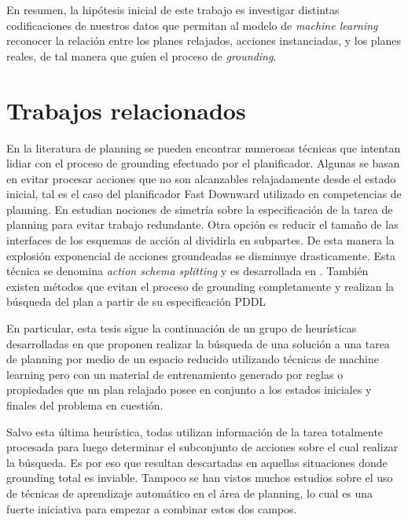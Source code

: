 En resumen, la hipótesis inicial de este trabajo es investigar distintas
codificaciones de nuestros datos que permitan al modelo de \emph{machine
learning} reconocer la relación entre los planes relajados, acciones
instanciadas, y los planes reales, de tal manera que guíen el proceso de
\emph{grounding}.

\section{Trabajos relacionados}

En la literatura de planning se pueden encontrar numerosas técnicas que intentan
lidiar con el proceso de grounding efectuado por el planificador. Algunas se
basan en evitar procesar acciones que no son alcanzables relajadamente desde el
estado inicial, tal es el caso del planificador Fast Downward
\citep{Helmert-2011} utilizado en competencias de planning. En
\citep{Röger_Sievers_Katz_2018} estudian nociones de simetría sobre la
especificación de la tarea de planning para evitar trabajo redundante. Otra
opción es reducir el tamaño de las interfaces de los esquemas de acción al
dividirla en subpartes. De esta manera la explosión exponencial de acciones
groundeadas se disminuye drasticamente. Esta técnica se denomina \emph{action
schema splitting} y es desarrollada en
\citep{Areces_Bustos_Dominguez_Hoffmann_2014}. También existen métodos que
evitan el proceso de grounding completamente y realizan la búsqueda del plan a
partir de su especificación PDDL \citep{Penberthy-1992}

En particular, esta tesis sigue la continuación de un grupo de heurísticas
desarrolladas en \citep{Gnad_Torralba_Dominguez_Areces_Bustos_2019} que proponen
realizar la búsqueda de una solución a una tarea de planning por medio de un
espacio reducido utilizando técnicas de machine learning pero con un material de
entrenamiento generado por reglas o propiedades que un plan relajado posee en
conjunto a los estados iniciales y finales del problema en cuestión.

Salvo esta última heurística, todas utilizan información de la tarea totalmente
procesada para luego determinar el subconjunto de acciones sobre el cual
realizar la búsqueda. Es por eso que resultan descartadas en aquellas
situaciones donde grounding total es inviable. Tampoco se han vistos muchos
estudios sobre el uso de técnicas de aprendizaje automático en el área de
planning, lo cual es una fuerte iniciativa para empezar a combinar estos dos
campos.

